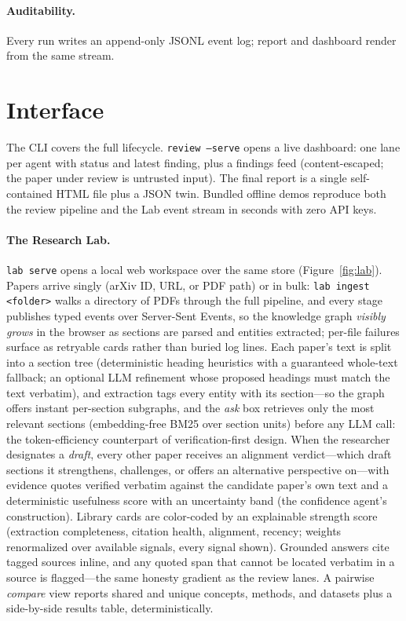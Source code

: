 \documentclass[11pt]{article}
\begin{document}
\paragraph{Auditability.} Every run writes an append-only JSONL event log; report and dashboard render from the same stream.

\section{Interface}
The CLI covers the full lifecycle. \texttt{review --serve} opens a live dashboard: one lane per agent with status and latest finding, plus a findings feed (content-escaped; the paper under review is untrusted input). The final report is a single self-contained HTML file plus a JSON twin. Bundled offline demos reproduce both the review pipeline and the Lab event stream in seconds with zero API keys.

\paragraph{The Research Lab.} \texttt{lab serve} opens a local web workspace over the same store (Figure~\ref{fig:lab}). Papers arrive singly (arXiv ID, URL, or PDF path) or in bulk: \texttt{lab ingest <folder>} walks a directory of PDFs through the full pipeline, and every stage publishes typed events over Server-Sent Events, so the knowledge graph \emph{visibly grows} in the browser as sections are parsed and entities extracted; per-file failures surface as retryable cards rather than buried log lines. Each paper's text is split into a section tree (deterministic heading heuristics with a guaranteed whole-text fallback; an optional LLM refinement whose proposed headings must match the text verbatim), and extraction tags every entity with its section---so the graph offers instant per-section subgraphs, and the \emph{ask} box retrieves only the most relevant sections (embedding-free BM25 over section units) before any LLM call: the token-efficiency counterpart of verification-first design. When the researcher designates a \emph{draft}, every other paper receives an alignment verdict---which draft sections it strengthens, challenges, or offers an alternative perspective on---with evidence quotes verified verbatim against the candidate paper's own text and a deterministic usefulness score with an uncertainty band (the confidence agent's construction). Library cards are color-coded by an explainable strength score (extraction completeness, citation health, alignment, recency; weights renormalized over available signals, every signal shown). Grounded answers cite tagged sources inline, and any quoted span that cannot be located verbatim in a source is flagged---the same honesty gradient as the review lanes. A pairwise \emph{compare} view reports shared and unique concepts, methods, and datasets plus a side-by-side results table, deterministically.
\end{document}
